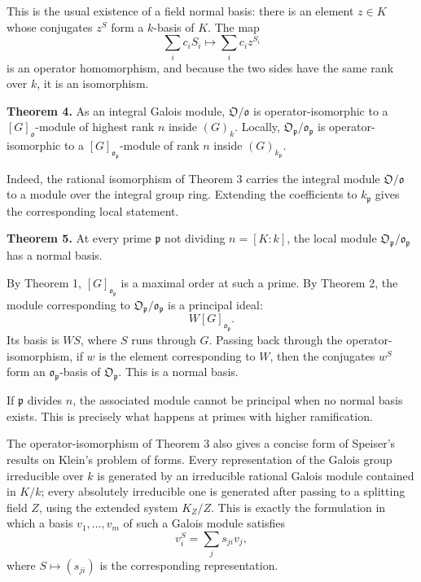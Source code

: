 \documentclass[11pt]{article}
\begin{document}
This is the usual existence of a field normal basis: there is an element
\(z\in K\) whose conjugates \(z^S\) form a \(k\)-basis of \(K\). The map
\[
  \sum_i c_iS_i\longmapsto \sum_i c_i z^{S_i}
\] is an operator homomorphism, and because the two sides have the same
rank over \(k\), it is an isomorphism.

\textbf{Theorem 4.} As an integral Galois module,
\(\mathfrak O/\mathfrak o\) is operator-isomorphic to a
\([G]_{\mathfrak o}\)-module of highest rank \(n\) inside \((G)_k\).
Locally, \(\mathfrak O_{\mathfrak p}/\mathfrak o_{\mathfrak p}\) is
operator-isomorphic to a \([G]_{\mathfrak o_{\mathfrak p}}\)-module of
rank \(n\) inside \((G)_{k_{\mathfrak p}}\).

Indeed, the rational isomorphism of Theorem 3 carries the integral
module \(\mathfrak O/\mathfrak o\) to a module over the integral group
ring. Extending the coefficients to \(k_{\mathfrak p}\) gives the
corresponding local statement.

\textbf{Theorem 5.} At every prime \(\mathfrak p\) not dividing
\(n=[K:k]\), the local module
\(\mathfrak O_{\mathfrak p}/\mathfrak o_{\mathfrak p}\) has a normal
basis.

By Theorem 1, \([G]_{\mathfrak o_{\mathfrak p}}\) is a maximal order at
such a prime. By Theorem 2, the module corresponding to
\(\mathfrak O_{\mathfrak p}/\mathfrak o_{\mathfrak p}\) is a principal
ideal: \[
  W [G]_{\mathfrak o_{\mathfrak p}}.
\] Its basis is \(WS\), where \(S\) runs through \(G\). Passing back
through the operator-isomorphism, if \(w\) is the element corresponding
to \(W\), then the conjugates \(w^S\) form an
\(\mathfrak o_{\mathfrak p}\)-basis of \(\mathfrak O_{\mathfrak p}\).
This is a normal basis.

If \(\mathfrak p\) divides \(n\), the associated module cannot be
principal when no normal basis exists. This is precisely what happens at
primes with higher ramification.

The operator-isomorphism of Theorem 3 also gives a concise form of
Speiser's results on Klein's problem of forms. Every representation of
the Galois group irreducible over \(k\) is generated by an irreducible
rational Galois module contained in \(K/k\); every absolutely
irreducible one is generated after passing to a splitting field \(Z\),
using the extended system \(K_Z/Z\). This is exactly the formulation in
which a basis \(v_1,
\ldots,v_m\) of such a Galois module satisfies \[
  v_i^S=\sum_j s_{ji}v_j,
\] where \(S\mapsto(s_{ji})\) is the corresponding representation.
\end{document}
